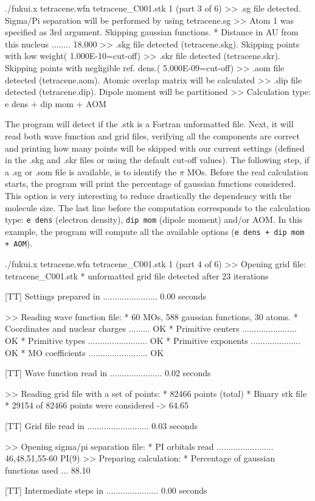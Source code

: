 \documentclass[a4paper,11pt,openany]{memoir}
\begin{document}
\begin{consola}{./fukui.x tetracene.wfn tetracene\_C001.stk 1 (part 3 of 6)}
>> .sg file detected. Sigma/Pi separation will be performed by using tetracene.sg
>> Atom 1 was specified as 3rd argument. Skipping gaussian functions.
* Distance in AU from this nucleus ........ 18.000
>> .skg file detected (tetracene.skg). Skipping points with low weight( 1.000E-10=cut-off)
>> .skr file detected (tetracene.skr). Skipping points with negligible ref. dens.( 5.000E-09=cut-off)
>> .aom file detected (tetracene.aom). Atomic overlap matrix will be calculated
>> .dip file detected (tetracene.dip). Dipole moment will be partitioned
>> Calculation type: e dens + dip mom + AOM
\end{consola}
The program will detect if the .stk is a Fortran unformatted file. Next, it will read both wave function and grid files, verifying all the components are correct and printing how many points will be skipped with our current settings (defined in the .skg and .skr files or using the default cut-off values). The following step, if a .sg or .som file is available, is to identify the $\pi$ \acp{MO}. Before the real calculation starts, the program will print the percentage of gaussian functions considered. This option is very interesting to reduce drastically the dependency with the molecule size. The last line before the computation corresponds to the calculation type: \texttt{e dens} (electron density), \texttt{dip mom} (dipole moment) and/or \acf{AOM}. In this example, the program will compute all the available options (\texttt{e dens + dip mom + AOM}).
\begin{consola}{./fukui.x tetracene.wfn tetracene\_C001.stk 1 (part 4 of 6)}
>> Opening grid file: tetracene_C001.stk
* unformatted grid file detected after 23 iterations

[TT] Settings prepared in ....................... 0.00 seconds

>> Reading wave function file:
* 60 MOs, 588 gaussian functions, 30 atoms.
* Coordinates and nuclear charges ......... OK
* Primitive centers ....................... OK
* Primitive types ......................... OK
* Primitive exponents ..................... OK
* MO coefficients ......................... OK

[TT] Wave function read in ...................... 0.02 seconds

>> Reading grid file with a set of points:
* 82466 points (total)
* Binary stk file
* 29154 of 82466 points were considered ->  64.65%

[TT] Grid file read in .......................... 0.03 seconds

>> Opening sigma/pi separation file:
* PI orbitals read ........................ 46,48,51,55-60 PI(9)
>> Preparing calculation:
* Percentage of gaussian functions used ... 88.10%

[TT] Intermediate steps in ...................... 0.00 seconds
\end{consola}
\end{document}
